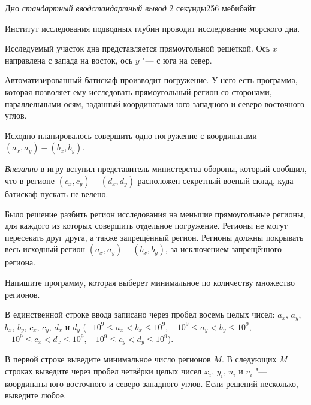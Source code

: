 %
%
\begin{problem}{Дно}
{\textsl{стандартный ввод}}{\textsl{стандартный вывод}}
{2 секунды}{256 мебибайт}{}

Институт исследования подводных глубин проводит исследование морского дна.

Исследуемый участок дна представляется прямоугольной решёткой. Ось
$x$ направлена с запада на восток, ось $y$ "--- с юга на север.

Автоматизированный батискаф производит погружение. У него есть программа,
которая позволяет ему исследовать прямоугольный регион со сторонами,
параллельными осям, заданный координатами юго-западного и северо-восточного
углов.

Исходно планировалось совершить одно погружение с координатами
$(a_x, a_y) - (b_x, b_y)$.

\emph{Внезапно} в игру вступил представитель министерства обороны,
который сообщил, что в регионе $(c_x, c_y) - (d_x, d_y)$
расположен секретный военый склад, куда батискаф пускать не велено.

Было решение разбить регион исследования на меньшие прямоугольные
регионы, для каждого из которых совершить отдельное погружение.
Регионы не могут пересекать друг друга, а также запрещённый регион.
Регионы должны покрывать весь исходный регион $(a_x, a_y) - (b_x, b_y)$,
за исключением запрещённого региона.

Напишите программу, которая выберет минимальное по количеству
множество регионов.

\InputFile

В единственной строке ввода записано через пробел восемь целых чисел:
$a_x$, $a_y$, $b_x$, $b_y$, $c_x$, $c_y$, $d_x$ и $d_y$
($-10^9 \le a_x < b_x \le 10^9$,
$-10^9 \le a_y < b_y \le 10^9$,
$-10^9 \le c_x < d_x \le 10^9$,
$-10^9 \le c_y < d_y \le 10^9$).

\OutputFile

В первой строке выведите минимальное число регионов $M$.
В следующих $M$ строках выведите через пробел четвёрки целых чисел
$x_i$, $y_i$, $u_i$ и $v_i$ "--- координаты юго-восточного и
северо-западного углов.
Если решений несколько, выведите любое.

\Example

\begin{example}
%
\end{example}

\end{problem}
